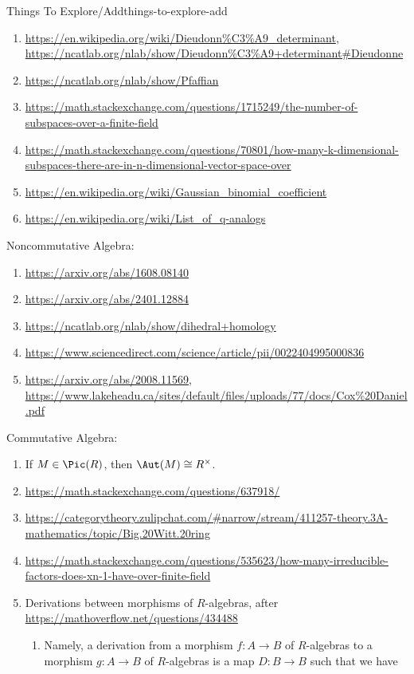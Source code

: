 \begin{remark}{Things To Explore/Add}{things-to-explore-add}
\begin{enumerate}
        \item \url{https://en.wikipedia.org/wiki/Dieudonn\%C3\%A9_determinant}, \url{https://ncatlab.org/nlab/show/Dieudonn\%C3\%A9+determinant\#Dieudonne}
        \item \url{https://ncatlab.org/nlab/show/Pfaffian}
        \item \url{https://math.stackexchange.com/questions/1715249/the-number-of-subspaces-over-a-finite-field}
        \item \url{https://math.stackexchange.com/questions/70801/how-many-k-dimensional-subspaces-there-are-in-n-dimensional-vector-space-over}
        \item \url{https://en.wikipedia.org/wiki/Gaussian_binomial_coefficient}
        \item \url{https://en.wikipedia.org/wiki/List_of_q-analogs}
    \end{enumerate}
    Noncommutative Algebra:
    \begin{enumerate}
        \item \url{https://arxiv.org/abs/1608.08140}
        \item \url{https://arxiv.org/abs/2401.12884}
        \item \url{https://ncatlab.org/nlab/show/dihedral+homology}
        \item \url{https://www.sciencedirect.com/science/article/pii/0022404995000836}
        \item \url{https://arxiv.org/abs/2008.11569}, \url{https://www.lakeheadu.ca/sites/default/files/uploads/77/docs/Cox\%20Daniel.pdf}
    \end{enumerate}
    Commutative Algebra:
    \begin{enumerate}
        \item If $M\in\Pic(R)$, then $\Aut(M)\cong R^{\times}$.
        \item \url{https://math.stackexchange.com/questions/637918/}
        \item \url{https://categorytheory.zulipchat.com/#narrow/stream/411257-theory.3A-mathematics/topic/Big.20Witt.20ring}
        \item \url{https://math.stackexchange.com/questions/535623/how-many-irreducible-factors-does-xn-1-have-over-finite-field}
        \item Derivations between morphisms of $R$-algebras, after \url{https://mathoverflow.net/questions/434488}
            \begin{enumerate}
                \item Namely, a derivation from a morphism $f\colon A\to B$ of $R$-algebras to a morphism $g\colon A\to B$ of $R$-algebras is a map $D\colon B\to B$ such that we have

\end{enumerate}
\end{enumerate}
\end{remark}
